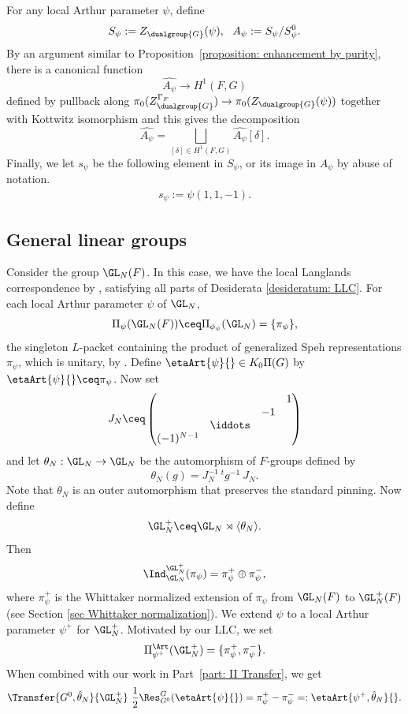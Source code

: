 \documentclass[11pt,letterpaper]{amsart}
\numberwithin{equation}{section}
\begin{document}
For any local Arthur parameter $\psi$, define
\[ S_{\psi}:= Z_{\dualgroup{G}}(\psi),\ \ 
A_\psi := S_{\psi}/S_{\psi}^0.
\]
By an argument similar to Proposition~\ref{proposition: enhancement by purity}, there is a canonical function
\[
\widehat{A_\psi} \to H^1(F,G)
\]
defined by pullback along $\pi_0(Z_{\dualgroup{G}}^{\Gamma_F}) \to \pi_0(Z_{\dualgroup{G}}(\psi))$ together with Kottwitz isomorphism and this gives the decomposition
\[
\widehat{A_\psi} = \mathop{\bigsqcup}\limits_{[\delta]\in H^1(F,G)} \widehat{A_\psi}[\delta].
\]
Finally, we let $s_{\psi}$ be the following element in $S_{\psi}$, or its image in $A_{\psi}$ by abuse of notation.
\begin{align}\label{eq def of s psi}
    s_{\psi}:= \psi\left(1,1, -1\right).
\end{align}



\subsection{General linear groups}\label{subsection: general linear}

Consider the group $\GL_N(F)$. In this case, we have the local Langlands correspondence by \cites{Hen00, HT01, Sch13}, satisfying all parts of Desiderata \ref{desideratum: LLC}.
For each local Arthur parameter $\psi$ of $\GL_N$, 
\[ 
\Pi_{\psi}(\GL_N(F)) \ceq \Pi_{\phi_{\psi}}(\GL_N) = \{\pi_\psi\}
,
\]
the singleton $L$-packet containing the product of generalized Speh representations $\pi_\psi$, which is unitary, by \cite{Tad86}. 
Define $\etaArt{\psi}{} \in K_0 \Pi(G)$ by $\etaArt{\psi}{} \ceq \pi_\psi$.
Now set
\[
J_{N} \ceq \begin{pmatrix}
&&&1 \\
&&-1& \\
&\iddots&&\\
(-1)^{N-1}&&&
\end{pmatrix}
\]
and let
$\theta_N : \GL_N \to \GL_N$ be the automorphism of $F$-groups defined by
\begin{equation}\label{equation: thetaN}
\theta_N(g) 
= 
J_N^{-1}\ {}^{t}g^{-1}\ J_N.
\end{equation}
Note that $\theta_N$ is an outer automorphism that preserves the standard pinning.
Now define
\[
\GL_N^+\ceq \GL_N\rtimes {\langle\theta_N\rangle}.
\]
Then
\[
\Ind_{\GL_N}^{\GL_N^+}(\pi_{\psi}) = \pi_{\psi}^+ \oplus \pi_{\psi}^-,
\]
where $\pi_{\psi}^+$ is the Whittaker normalized extension of $\pi_{\psi}$ from $\GL_N(F)$ to $\GL_N^+(F)$ (see Section \ref{sec Whittaker normalization}).
We extend $\psi$ to a local Arthur parameter $\psi^+$ for $\GL_N^+$.
Motivated by our LLC, we set
\[
\Pi^\Art_{\psi^+}(\GL_N^+) 
= 
\{ \pi_{\psi}^+,\pi_{\psi}^- \}.
\]
When combined with our work in Part~\ref{part: II Transfer}, we get
\begin{align}\label{eq Arthur distribution disconnected GL}
    \Transfer{G^0,{\hat\theta_N}}{\GL_N^+}\ \frac{1}{2} \Res^{G}_{G^0} (\etaArt{\psi}{}) 
=
\pi_{\psi}^+ - \pi_{\psi}^- =:\etaArt{\psi^+,{\hat\theta_N}}{}.
\end{align}
\end{document}
